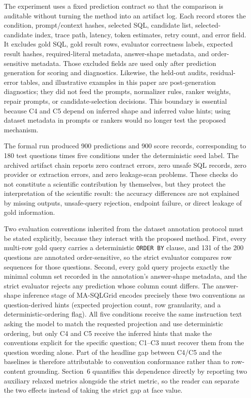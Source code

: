 \documentclass{ieeeaccess}
\begin{document}
The experiment uses a fixed prediction contract so that the comparison is auditable without turning the method into an artifact log. Each record stores the condition, prompt/context hashes, selected SQL, candidate list, selected-candidate index, trace path, latency, token estimates, retry count, and error field. It excludes gold SQL, gold result rows, evaluator correctness labels, expected result hashes, required-literal metadata, answer-shape metadata, and order-sensitive metadata. Those excluded fields are used only after prediction generation for scoring and diagnostics. Likewise, the held-out audits, residual-error tables, and illustrative examples in this paper are post-generation diagnostics; they did not feed the prompts, normalizer rules, ranker weights, repair prompts, or candidate-selection decisions. This boundary is essential because C4 and C5 depend on inferred shape and inferred value hints; using dataset metadata in prompts or rankers would no longer test the proposed mechanism.

The formal run produced 900 predictions and 900 score records, corresponding to 180 test questions times five conditions under the deterministic seed label. The archived artifact chain reports zero contract errors, zero unsafe SQL records, zero provider or extraction errors, and zero leakage-scan problems. These checks do not constitute a scientific contribution by themselves, but they protect the interpretation of the scientific result: the accuracy differences are not explained by missing outputs, unsafe-query rejection, endpoint failure, or direct leakage of gold information.

Two evaluation conventions inherited from the dataset annotation protocol must be stated explicitly, because they interact with the proposed method. First, every multi-row gold query carries a deterministic \texttt{ORDER BY} clause, and 131 of the 200 questions are annotated order-sensitive, so the strict evaluator compares row sequences for those questions. Second, every gold query projects exactly the minimal column set recorded in the annotation's answer-shape metadata, and the strict evaluator rejects any prediction whose column count differs. The answer-shape inference stage of MA-SQLGrid encodes precisely these two conventions as question-derived hints (expected projection count, row granularity, and a deterministic-ordering flag). All five conditions receive the same instruction text asking the model to match the requested projection and use deterministic ordering, but only C4 and C5 receive the inferred hints that make the conventions explicit for the specific question; C1--C3 must recover them from the question wording alone. Part of the headline gap between C4/C5 and the baselines is therefore attributable to convention conformance rather than to row-content grounding. Section~6 quantifies this dependence directly by reporting two auxiliary relaxed metrics alongside the strict metric, so the reader can separate the two effects instead of taking the strict gap at face value.
\end{document}
